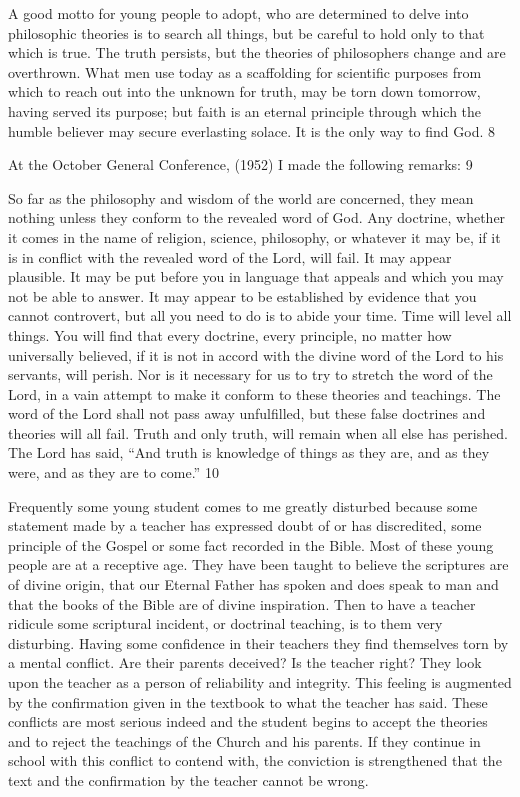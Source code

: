 A good motto for young people to adopt, who are determined to delve into philosophic
theories is to search all things, but be careful to hold only to that which is true. The truth
persists, but the theories of philosophers change and are overthrown. What men use today as
a scaffolding for scientific purposes from which to reach out into the unknown for truth, may
be torn down tomorrow, having served its purpose; but faith is an eternal principle through
which the humble believer may secure everlasting solace. It is the only way to find God. 8

At the October General Conference, (1952) I made the following remarks: 9

So far as the philosophy and wisdom of the world are concerned, they mean nothing unless
they conform to the revealed word of God. Any doctrine, whether it comes in the name of
religion, science, philosophy, or whatever it may be, if it is in conflict with the revealed word
of the Lord, will fail. It may appear plausible. It may be put before you in language that
appeals and which you may not be able to answer. It may appear to be established by
evidence that you cannot controvert, but all you need to do is to abide your time. Time will
level all things. You will find that every doctrine, every principle, no matter how universally
believed, if it is not in accord with the divine word of the Lord to his servants, will perish.
Nor is it necessary for us to try to stretch the word of the Lord, in a vain attempt to make it
conform to these theories and teachings. The word of the Lord shall not pass away
unfulfilled, but these false doctrines and theories will all fail. Truth and only truth, will
remain when all else has perished. The Lord has said, ``And truth is knowledge of things as
they are, and as they were, and as they are to come.'' 10

Frequently some young student comes to me greatly disturbed because some statement made
by a teacher has expressed doubt of or has discredited, some principle of the Gospel or some
fact recorded in the Bible. Most of these young people are at a receptive age. They have been
taught to believe the scriptures are of divine origin, that our Eternal Father has spoken and
does speak to man and that the books of the Bible are of divine inspiration. Then to have a
teacher ridicule some scriptural incident, or doctrinal teaching, is to them very disturbing.
Having some confidence in their teachers they find themselves torn by a mental conflict. Are
their parents deceived? Is the teacher right? They look upon the teacher as a person of
reliability and integrity. This feeling is augmented by the confirmation given in the textbook
to what the teacher has said. These conflicts are most serious indeed and the student begins to
accept the theories and to reject the teachings of the Church and his parents. If they continue
in school with this conflict to contend with, the conviction is strengthened that the text and
the confirmation by the teacher cannot be wrong.

